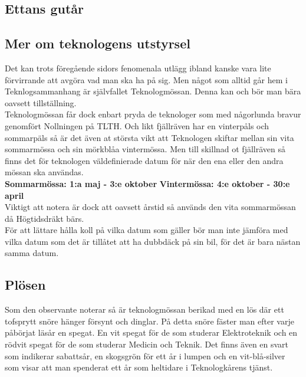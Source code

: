\subsection*{Ettans gutår}


\newpage

\subsection*{Mer om teknologens utstyrsel}
Det kan trots föregående sidors fenomenala utlägg ibland kanske vara lite förvirrande att avgöra vad man ska ha på sig.
Men något som alltid går hem i Teknlogsammanhang är självfallet Teknologmössan.
Denna kan och bör man bära oavsett tillställning.
\\

Teknologmössan får dock enbart pryda de teknologer som med någorlunda bravur genomfört Nollningen på TLTH.
Och likt fjällräven har en vinterpåls och sommarpäls så är det även at största vikt att Teknologen skiftar mellan sin vita sommarmössa och sin mörkblåa vintermössa.
Men till skillnad ot fjällräven så finns det för teknologen väldefinierade datum för när den ena eller den andra mössan ska användas.
\\

\textbf{Sommarmössa: 1:a maj - 3:e oktober}
\textbf{Vintermössa: 4:e oktober - 30:e april}
\\

Viktigt att notera är dock att oavsett årstid så används den vita sommarmössan då Högtidsdräkt bärs.
\\

För att lättare hålla koll på vilka datum som gäller bör man inte jämföra med vilka datum som det är tillåtet att ha dubbdäck på sin bil, för det är bara nästan samma datum.

\newpage

\subsection*{Plösen}
Som den observante noterar så är teknologmössan berikad med en lös där ett tofsprytt snöre hänger försynt och dinglar.
På detta snöre fäster man efter varje påbörjat läsår en spegat. En vit spegat för de som studerar Elektroteknik och en rödvit spegat för de som studerar Medicin och Teknik.
Det finns även en svart som indikerar sabattsår, en skogsgrön för ett år i lumpen och en vit-blå-silver som visar att man spenderat ett år som heltidare i Teknologkårens tjänst.
\\

